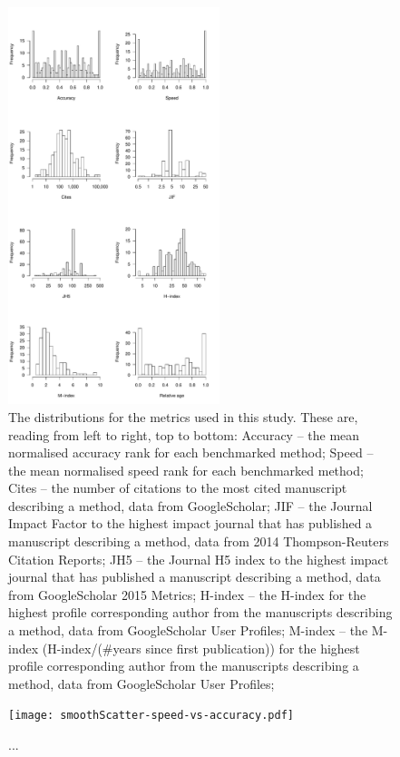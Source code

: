 \documentclass[fleqn,10pt]{SelfArx} %
\begin{document}
\begin{figure}[H]
\centering
\includegraphics[width=0.55\textwidth]{supplementary-figures-small.pdf}
\caption{The distributions for the metrics used in this study. These
are, reading from left to right, top to bottom: Accuracy -- the mean
normalised accuracy rank for each benchmarked method; Speed -- the
mean normalised speed rank for each benchmarked method; Cites -- the number of
citations to the most cited manuscript describing a method, data from GoogleScholar;
JIF -- the Journal Impact Factor to the highest impact journal that has published
a manuscript describing a method, data from 2014 Thompson-Reuters Citation Reports;
JH5 -- the Journal H5 index to the highest impact journal that has published
a manuscript describing a method, data from GoogleScholar 2015 Metrics;
H-index -- the H-index for the highest profile corresponding author from the
manuscripts describing a method, data from GoogleScholar User Profiles;
M-index -- the M-index (H-index/(\#years since first publication)) for the
highest profile corresponding author from the manuscripts describing a method,
data from GoogleScholar User Profiles;}
\label{fig:S1}
\end{figure}



\begin{figure}[H]
\centering
\texttt{[image: smoothScatter-speed-vs-accuracy.pdf]}
\caption{...}
\label{fig:S2}
\end{figure}
\end{document}
